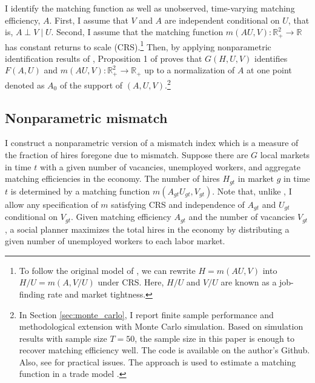 \documentclass[12pt]{article}
\begin{document}
I identify the matching function as well as unobserved, time-varying matching efficiency, $A .$ 
First, I assume that $V$ and $A$ are independent conditional on $U$, that is, $A \perp V \mid U$. 
Second, I assume that the matching function $m(AU,V):\mathbb{R}_{+}^2 \rightarrow \mathbb{R}$ has constant returns to scale (CRS).\footnote{To follow the original model of \cite{matzkin2003nonparametric}, we can rewrite $H=m(AU,V)$ into $H/U=m(A,V/U)$ under CRS. Here, $H/U$ and $V/U$ are known as a job-finding rate and market tightness.} 
Then, by applying nonparametric identification results of \cite{matzkin2003nonparametric}, Proposition 1 of \cite{lange2020beyond} proves that $G(H, U, V)$ identifies $F(A, U)$ and $m(A U, V): \mathbb{R}_{+}^2 \rightarrow \mathbb{R}_{+}$ up to a normalization of $A$ at one point denoted as $A_0$ of the support of $(A, U, V)$.\footnote{In Section \ref{sec:monte_carlo}, I report finite sample performance and methodological extension with Monte Carlo simulation. Based on simulation results with sample size $T=50$, the sample size in this paper is enough to recover matching efficiency well. The code is available on the author's Github. Also, see \cite{brancaccio2020guide} for practical issues. The approach is used to estimate a matching function in a trade model \citep{brancaccio2020geography,brancaccio2023search}.}

\subsection{Nonparametric mismatch}
I construct a nonparametric version of a mismatch index which is a measure of the fraction of hires foregone due to mismatch. 
Suppose there are $G$ local markets in time $t$ with a given number of vacancies, unemployed workers, and aggregate matching efficiencies in the economy.
The number of hires $H_{gt}$ in market $g$ in time $t$ is determined by a matching function $ m(A_{gt}U_{gt},V_{gt})$. 
Note that, unlike \cite{csahin2014mismatch}, I allow any specification of $m$ satisfying CRS and independence of $A_{gt}$ and $U_{gt}$ conditional on $V_{gt}$.
Given matching efficiency $A_{gt}$ and the number of vacancies $V_{gt}$, a social planner maximizes the total hires in the
economy by distributing a given number of unemployed workers to each labor market.
\end{document}
